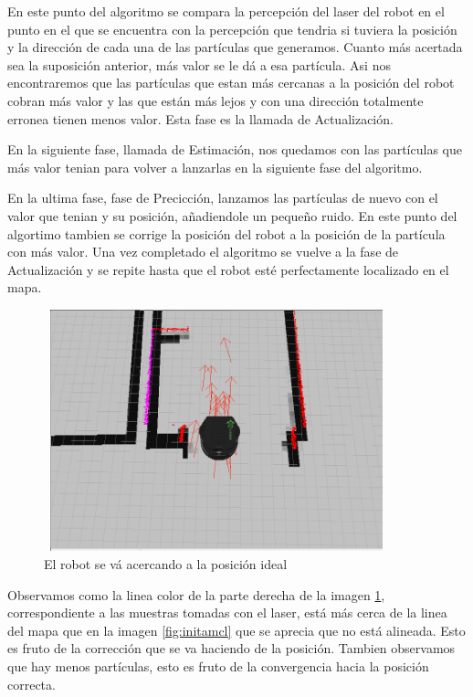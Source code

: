 En este punto del algoritmo se compara la percepción del laser del robot en el punto en el que se encuentra con la percepción que tendria si tuviera la posición y la dirección de cada una de las partículas que generamos. Cuanto más acertada sea la suposición anterior, más valor se le dá a esa partícula. Asi nos encontraremos que las partículas que estan más cercanas a la posición del robot cobran más valor y las que están más lejos y con una dirección totalmente erronea tienen menos valor. Esta fase es la llamada de Actualización. 

En la siguiente fase, llamada de Estimación, nos quedamos con las partículas que más valor tenian para volver a lanzarlas en la siguiente fase del algoritmo.

En la ultima fase, fase de Precicción, lanzamos las partículas de nuevo con el valor que tenian y su posición, añadiendole un pequeño ruido.
En este punto del algortimo tambien se corrige la posición del robot a la posición de la partícula con más valor.
Una vez completado el algoritmo se vuelve a la fase de Actualización y se repite hasta que el robot esté perfectamente localizado en el 
mapa.

\begin{figure}[hbtp]
  \begin{center}
    \includegraphics[width=10cm,height=7cm]{img/cap5/actamcl}
  \end{center}
  \caption{El robot se vá acercando a la posición ideal}
  \label{fig:actamcl}
\end{figure}
\pagebreak

Observamos como la linea color de la parte derecha de la imagen \ref{fig:actamcl}, correspondiente a las muestras tomadas con el laser, está más cerca de la linea del mapa que en la imagen \ref{fig:initamcl} que se aprecia que no está alineada. Esto es fruto de la corrección que se va haciendo de la posición. Tambien observamos que hay menos partículas, esto es fruto de la convergencia hacia la posición correcta.

